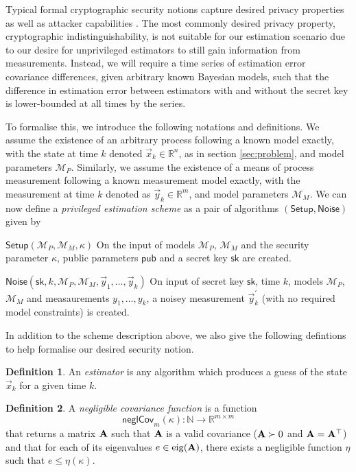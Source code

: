 \documentclass[conference]{IEEEtran}
\theoremstyle{definition}
\newtheorem{definition}{Definition}[section]
\theoremstyle{definition}
\theoremstyle{remark}
\begin{document}
Typical formal cryptographic security notions capture desired privacy properties as well as attacker capabilities \cite{katzIntroductionModernCryptography2008}. The most commonly desired privacy property, cryptographic indistinguishability, is not suitable for our estimation scenario due to our desire for unprivileged estimators to still gain  information from measurements. Instead, we will require a time series of estimation error covariance differences, given arbitrary known Bayesian models, such that the difference in estimation error between estimators with and without the secret key is lower-bounded at all times by the series.

To formalise this, we introduce the following notations and definitions. We assume the existence of an arbitrary process following a known model exactly, with the state at time $k$ denoted $\vec{x}_k\in\mathbb{R}^n$, as in section \ref{sec:problem}, and model parameters $\mathcal{M}_P$. Similarly, we assume the existence of a means of process measurement following a known measurement model exactly, with the measurement at time $k$ denoted as $\vec{y}_k\in\mathbb{R}^m$, and model parameters $\mathcal{M}_M$. We can now define a \textit{privileged estimation scheme} as a pair of algorithms $(\mathsf{Setup},\mathsf{Noise})$ given by
\begin{LaTeXdescription}
   \item[$\mathsf{Setup}(\mathcal{M}_P, \mathcal{M}_M, \kappa)$] On the input of models $\mathcal{M}_P$, $\mathcal{M}_M$ and the security parameter $\kappa$, public parameters $\mathsf{pub}$ and a secret key $\mathsf{sk}$ are created.
   \item[$\mathsf{Noise}(\mathsf{sk}, k, \mathcal{M}_P, \mathcal{M}_M, \vec{y}_1, \dots, \vec{y}_k)$] On input of secret key $\mathsf{sk}$, time $k$, models $\mathcal{M}_P$, $\mathcal{M}_M$ and measaurements $y_1,\dots,y_k$, a noisey measurement $\vec{y}^\prime_k$ (with no required model constraints) is created.
\end{LaTeXdescription}
In addition to the scheme description above, we also give the following defintions to help formalise our desired security notion.
\begin{definition}
   An \textit{estimator} is any algorithm which produces a guess of the state $\vec{x}_k$ for a given time $k$.
\end{definition}
\begin{definition}
   A \textit{negligible covariance function} is a function 
   \begin{equation}
      \mathsf{neglCov}_m(\kappa):\mathbb{N}\rightarrow \mathbb{R}^{m\times m}
   \end{equation}
   that returns a matrix ${{\mathbf{A}}}$ such that ${{\mathbf{A}}}$ is a valid covariance (${{\mathbf{A}}}\succ 0$ and ${{\mathbf{A}}}={{\mathbf{A}}}^\top$) and that for each of its eigenvalues $e\in\operatorfont{eig}(\mat{A})$, there exists a negligible function $\eta$ such that $e\leq\eta(\kappa)$.
\end{definition}
\end{document}
